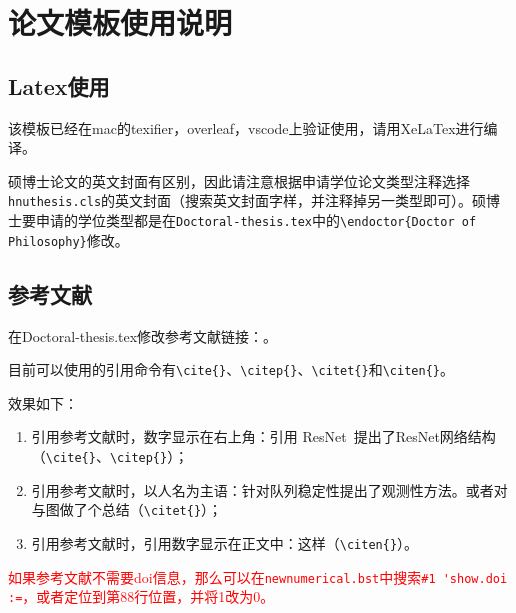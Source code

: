 \chapter{论文模板使用说明}
\section{Latex使用}
该模板已经在mac的texifier，overleaf，vscode上验证使用，请用XeLaTex进行编译。

硕博士论文的英文封面有区别，因此请注意根据申请学位论文类型注释选择\lstinline!hnuthesis.cls!的英文封面（搜索英文封面字样，并注释掉另一类型即可）。硕博士要申请的学位类型都是在\lstinline!Doctoral-thesis.tex!中的\lstinline!\endoctor{Doctor of Philosophy}!修改。



\section{参考文献}

在Doctoral-thesis.tex修改参考文献链接：\lstinline!!。

目前可以使用的引用命令有\lstinline!\cite{}!、\lstinline!\citep{}!、\lstinline!\citet{}!和\lstinline!\citen{}!。

效果如下：
\begin{enumerate}
	\item 引用参考文献时，数字显示在右上角：引用 ResNet~\cite{2020_aradi_Survey}提出了ResNet网络结构\citep{2020_aradi_Survey}（\lstinline!\cite{}!、\lstinline!\citep{}!）；
	\item 引用参考文献时，以人名为主语：\citet{2017_qinxiaohui_FeiYunZhiCheLiangDuiLieDeFenBuShiKongZhi}针对队列稳定性提出了观测性方法。或者\citet{2021_chen_Graph}对与图做了个总结（\lstinline!\citet{}!）；
	\item 引用参考文献时，引用数字显示在正文中：这样（\lstinline!\citen{}!）。
\end{enumerate}

\textcolor{red}{如果参考文献不需要doi信息，那么可以在\lstinline!newnumerical.bst!中搜索\lstinline!#1 'show.doi :=!，或者定位到第88行位置，并将1改为0。}

